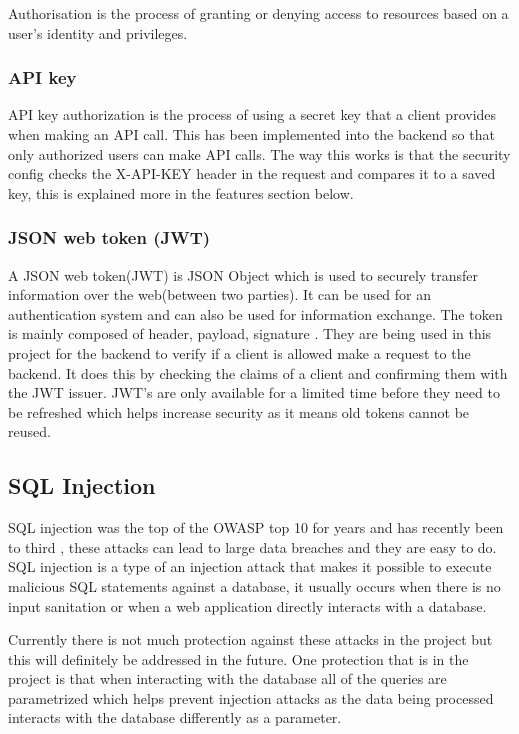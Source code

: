 \documentclass[]{project_report}
\begin{document}
Authorisation is the process of granting or denying access to resources based on a user's identity and privileges.

\subsubsection{API key}

API key authorization is the process of using a secret key that a client provides when making an API call. This has been implemented into the backend so that only authorized users can make API calls. The way this works is that the security config checks the X-API-KEY header in the request and compares it to a saved key, this is explained more in the features section below.

\subsubsection{JSON web token (JWT)}

A JSON web token(JWT) is JSON Object which is used to securely transfer information over the web(between two parties). It can be used for an authentication system and can also be used for information exchange. The token is mainly composed of header, payload, signature \cite{jwt}. They are being used in this project for the backend to verify if a client is allowed make a request to the backend. It does this by checking the claims of a client and confirming them with the JWT issuer. JWT's are only available for a limited time before they need to be refreshed which helps increase security as it means old tokens cannot be reused.

\subsection{SQL Injection}

SQL injection was the top of the OWASP top 10 for years and has recently been to third \cite{owasp_10}, these attacks can lead to large data breaches and they are easy to do. SQL injection is a type of an injection attack that makes it possible to execute malicious SQL statements against a database, it usually occurs when there is no input sanitation or when a web application directly interacts with a database.

Currently there is not much protection against these attacks in the project but this will definitely be addressed in the future. One protection that is in the project is that when interacting with the database all of the queries are parametrized which helps prevent injection attacks as the data being processed interacts with the database differently as a parameter.
\end{document}
